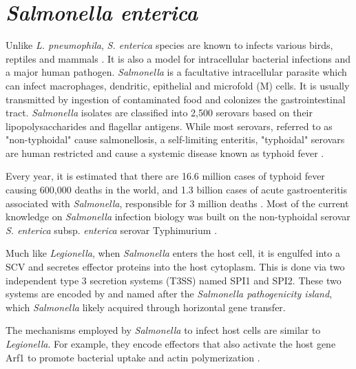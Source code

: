 \section{\textit{Salmonella enterica}}

Unlike \textit{L. pneumophila}, \textit{S. enterica} species are known to infects various birds, reptiles and mammals \cite{uzzauHostAdaptedSerotypes2000}. It is also a model for intracellular bacterial infections and a major human pathogen. \textit{Salmonella} is a facultative intracellular parasite which can infect macrophages, dendritic, epithelial and microfold (M) cells. It is usually transmitted by ingestion of contaminated food and colonizes the gastrointestinal tract. \textit{Salmonella} isolates are classified into 2,500 serovars based on their lipopolysaccharides and flagellar antigens. While most serovars, referred to as "non-typhoidal" cause salmonellosis, a self-limiting enteritis, "typhoidal" serovars are human restricted and cause a systemic disease known as typhoid fever \cite{larockSalmonellaeInteractionsHost2015}.

Every year, it is estimated that there are 16.6 million cases of typhoid fever causing 600,000 deaths in the world, and 1.3 billion cases of acute gastroenteritis associated with \textit{Salmonella}, responsible for 3 million deaths \cite{pangTyphoidFeverOther1995}. Most of the current knowledge on \textit{Salmonella} infection biology was built on the non-typhoidal serovar \textit{S. enterica} subsp. \textit{enterica} serovar Typhimurium \cite{larockSalmonellaeInteractionsHost2015}. 

Much like \textit{Legionella}, when \textit{Salmonella} enters the host cell, it is engulfed into a \acrfull{SCV}  and secretes effector proteins into the host cytoplasm. This is done via two independent type 3 secretion systems (T3SS) named SPI1 and SPI2. These two systems are encoded by and named after the \textit{Salmonella pathogenicity island}, which \textit{Salmonella} likely acquired through horizontal gene transfer.

The mechanisms employed by \textit{Salmonella} to infect host cells are similar to \textit{Legionella}. For example, they encode effectors that also activate the host gene Arf1 to promote bacterial uptake and actin polymerization \cite{larockSalmonellaeInteractionsHost2015}.
